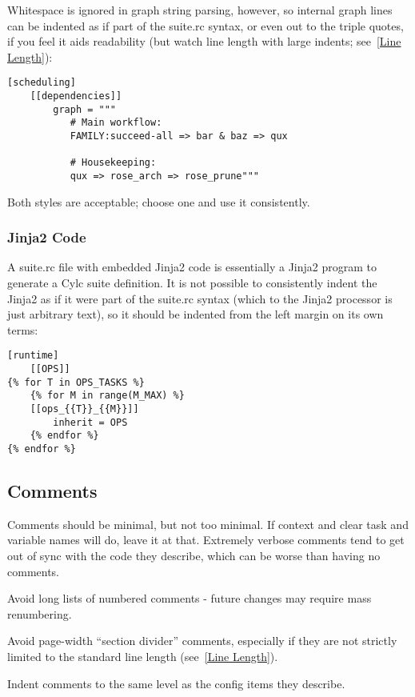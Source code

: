Whitespace is ignored in graph string parsing, however, so internal graph lines
can be indented as if part of the suite.rc syntax, or even out to the triple
quotes, if you feel it aids readability (but watch line length with large
indents; see~\ref{Line Length}):

\lstset{language=suiterc}
\begin{lstlisting}
[scheduling]
    [[dependencies]]
        graph = """
           # Main workflow:
           FAMILY:succeed-all => bar & baz => qux

           # Housekeeping:
           qux => rose_arch => rose_prune"""
\end{lstlisting}

Both styles are acceptable; choose one and use it consistently.

\subsubsection{Jinja2 Code}

A suite.rc file with embedded Jinja2 code is essentially a Jinja2 program to
generate a Cylc suite definition. It is not possible to consistently indent the
Jinja2 as if it were part of the suite.rc syntax (which to the Jinja2 processor
is just arbitrary text), so it should be indented from the left margin on
its own terms:

\lstset{language=suiterc}
\begin{lstlisting}
[runtime]
    [[OPS]]
{% for T in OPS_TASKS %}
    {% for M in range(M_MAX) %}
    [[ops_{{T}}_{{M}}]]
        inherit = OPS
    {% endfor %}
{% endfor %}
\end{lstlisting}

\subsection{Comments}

Comments should be minimal, but not too minimal. If context and clear
task and variable names will do, leave it at that. Extremely verbose comments
tend to get out of sync with the code they describe, which can be worse
than having no comments.

Avoid long lists of numbered comments - future changes may require mass
renumbering.

Avoid page-width ``section divider'' comments, especially if they are not
strictly limited to the standard line length (see~\ref{Line Length}).

Indent comments to the same level as the config items they describe.

